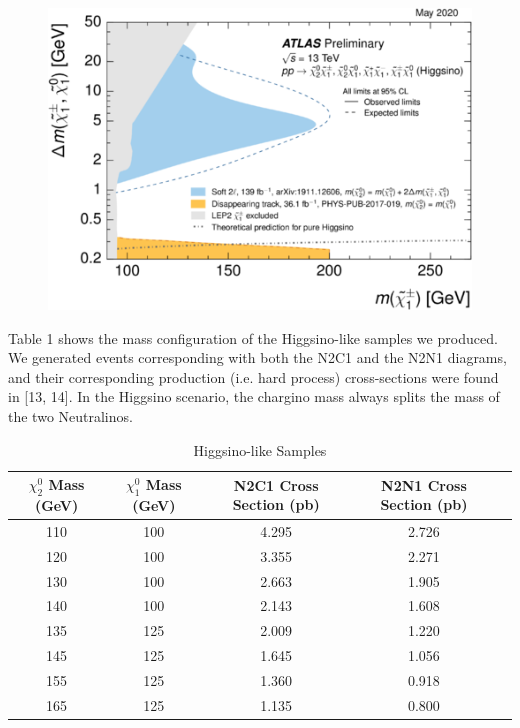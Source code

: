 \documentclass{article}
\begin{document}
\begin{figure}[H]
    \centering
    \caption{} 
    \includegraphics[width=12cm]{ATLAS.png}
    \label{fig:4}
\end{figure}
\par
Table 1 shows the mass configuration of the Higgsino-like samples we produced. We generated events corresponding with both the N2C1 and the N2N1 diagrams, and their corresponding production (i.e. hard process) cross-sections were found in [13, 14]. In the Higgsino scenario, the chargino mass always splits the mass of the two Neutralinos.
\begin{centering}
    \begin{table}[h]
        \begin{tabular}{||c|c|c|c|c|||}
             \hline $\chi^{0}_{2}$ Mass (GeV) & $\chi^{0}_{1}$ Mass (GeV) & N2C1 Cross Section (pb) & N2N1 Cross Section (pb)\\ [0.2ex]
             \hline
             110 & 100 & 4.295 & 2.726 \\
             \hline
             120 & 100 & 3.355 & 2.271 \\
             \hline
             130 & 100 & 2.663 & 1.905 \\
             \hline
             140 & 100 & 2.143 & 1.608 \\
             \hline
             135 & 125 & 2.009 & 1.220 \\
             \hline
             145 & 125 & 1.645 & 1.056 \\
             \hline
             155 & 125 & 1.360 & 0.918 \\
             \hline
             165 & 125 & 1.135 & 0.800 \\
             \hline
        \end{tabular}
        \caption{Higgsino-like Samples}
        \label{table:1}
    \end{table}
\end{centering}
\end{document}
